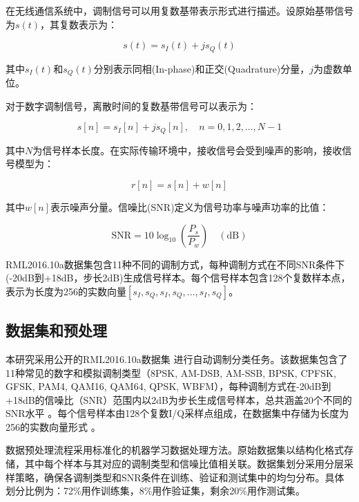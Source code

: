 \documentclass[conference]{IEEEtran}
\begin{document}
在无线通信系统中，调制信号可以用复数基带表示形式进行描述。设原始基带信号为$s(t)$，其复数表示为：

\begin{equation}
s(t) = s_I(t) + js_Q(t)
\end{equation}

其中$s_I(t)$和$s_Q(t)$分别表示同相(In-phase)和正交(Quadrature)分量，$j$为虚数单位。

对于数字调制信号，离散时间的复数基带信号可以表示为：

\begin{equation}
s[n] = s_I[n] + js_Q[n], \quad n = 0, 1, 2,..., N-1
\end{equation}

其中$N$为信号样本长度。在实际传输环境中，接收信号会受到噪声的影响，接收信号模型为：

\begin{equation}
r[n] = s[n] + w[n]
\end{equation}

其中$w[n]$表示噪声分量。信噪比(SNR)定义为信号功率与噪声功率的比值：

\begin{equation}
\mathrm{SNR} = 10\log_{10}\left(\frac{P_s}{P_w}\right) \quad(\mathrm{dB})
\end{equation}


RML2016.10a数据集包含11种不同的调制方式，每种调制方式在不同SNR条件下(-20dB到+18dB，步长2dB)生成信号样本。每个信号样本包含128个复数样本点，表示为长度为256的实数向量$[s_I, s_Q, s_I, s_Q,..., s_I, s_Q]$。

\subsection{数据集和预处理}

本研究采用公开的RML2016.10a数据集 \cite{oshea2016radio} 进行自动调制分类任务。该数据集包含了11种常见的数字和模拟调制类型（8PSK, AM-DSB, AM-SSB, BPSK, CPFSK, GFSK, PAM4, QAM16, QAM64, QPSK, WBFM），每种调制方式在-20dB到+18dB的信噪比（SNR）范围内以2dB为步长生成信号样本，总共涵盖20个不同的SNR水平 \cite{b1}\cite{b2}\cite{b3}。每个信号样本由128个复数I/Q采样点组成，在数据集中存储为长度为256的实数向量形式 \cite{b1}\cite{oshea2016convolutional}。

数据预处理流程采用标准化的机器学习数据处理方法。原始数据集以结构化格式存储，其中每个样本与其对应的调制类型和信噪比值相关联。数据集划分采用分层采样策略，确保各调制类型和SNR条件在训练、验证和测试集中的均匀分布。具体划分比例为：72\%用作训练集，8\%用作验证集，剩余20\%用作测试集。
\end{document}
